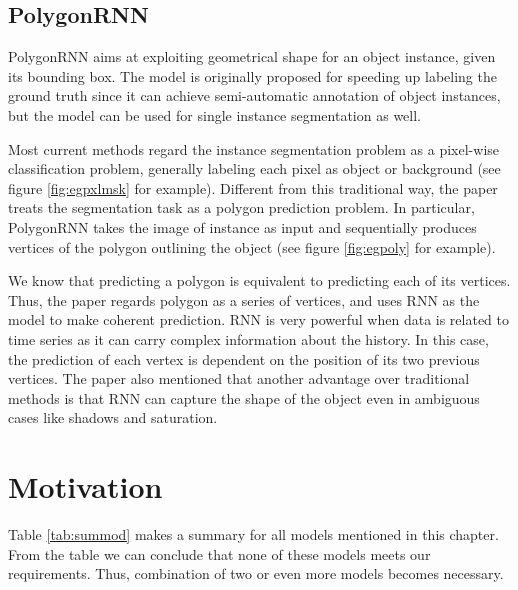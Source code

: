 

\subsection{PolygonRNN}\label{polygonrnn}
PolygonRNN \cite{polygonrnn} aims at exploiting geometrical shape for an object instance, given its bounding box. The model is originally proposed for speeding up labeling the ground truth since it can achieve semi-automatic annotation of object instances, but the model can be used for single instance segmentation as well.

Most current methods regard the instance segmentation problem as a pixel-wise classification problem, generally labeling each pixel as object or background (see figure \ref{fig:egpxlmsk} for example). Different from this traditional way, the paper treats the segmentation task as a polygon prediction problem. In particular, PolygonRNN takes the image of instance as input and sequentially produces vertices of the polygon outlining the object (see figure \ref{fig:egpoly} for example).



We know that predicting a polygon is equivalent to predicting each of its vertices. Thus, the paper regards polygon as a series of vertices, and uses RNN as the model to make coherent prediction. RNN is very powerful when data is related to time series as it can carry complex information about the history. In this case, the prediction of each vertex is dependent on the position of its two previous vertices. The paper also mentioned that another advantage over traditional methods is that RNN can capture the shape of the object even in ambiguous cases like shadows and saturation.

\section{Motivation}\label{motivation}
Table \ref{tab:summod} makes a summary for all models mentioned in this chapter. From the table we can conclude that none of these models meets our requirements. Thus, combination of two or even more models becomes necessary.

